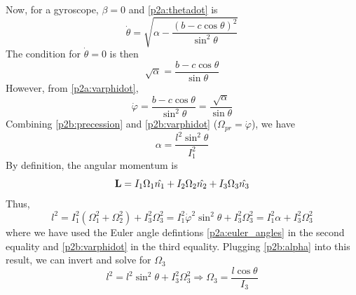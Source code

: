 \documentclass[12pt]{article}
\begin{document}
\begin{problem}{2}
\begin{solution}
Now, for a gyroscope, $\beta=0$ and \eqref{p2a:thetadot} is
\begin{equation}
    \dot\theta=\sqrt{\alpha-\frac{(b-c\cos\theta)^2}{\sin^2\theta}} 
\end{equation}
The condition for $\dot\theta=0$ is then
\begin{equation}
    \sqrt{\alpha}=\frac{b-c\cos\theta}{\sin\theta} 
\end{equation}
However, from \eqref{p2a:varphidot},
\begin{equation}\label{p2b:varphidot}
    \dot\varphi=\frac{b-c\cos\theta}{\sin^2\theta}=\frac{\sqrt\alpha}{\sin\theta}
\end{equation}
Combining \eqref{p2b:precession} and \eqref{p2b:varphidot}
($\Omega_{pr}=\dot\varphi$), we have
\begin{equation}\label{p2b:alpha}
    \alpha=\frac{l^2\sin^2\theta}{I_1^2} 
\end{equation}
By definition, the angular momentum is
\begin{equation}
    \vb{L}=I_1\Omega_1\hat{n_1}+ I_2\Omega_2\hat{n_2}+ I_3\Omega_3\hat{n_3}
\end{equation}
Thus,
\begin{equation}
    l^2=I_1^2(\Omega_1^2+\Omega_2^2)+I_3^2\Omega_3^2 
    =I_1^2\dot\varphi^2\sin^2\theta+I_3^2\Omega_3^2
    =I_1^2\alpha+I_3^2\Omega_3^2
\end{equation}
where we have used the Euler angle defintions \eqref{p2a:euler_angles} in the
second equality and \eqref{p2b:varphidot} in the third equality. Plugging
\eqref{p2b:alpha} into this result, we can invert and solve for $\Omega_3$
\begin{equation}
    l^2=l^2\sin^2\theta+I_3^2\Omega_3^2\Rightarrow\Omega_3=\frac{l\cos\theta}{I_3} 
\end{equation}

\end{solution}
\end{problem}
\end{document}
